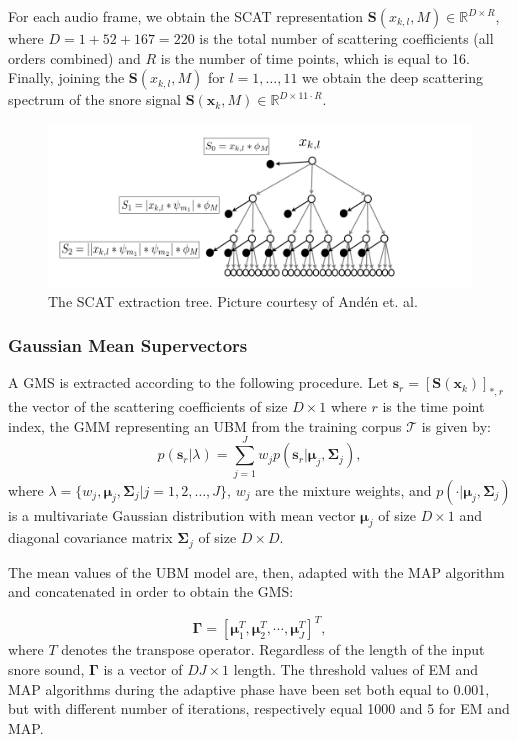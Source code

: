 For each audio frame, we obtain the SCAT representation $\mathbf{S}(x_{k,l}, M) \in \mathbb{R}^{D \times R}$, where $D=1+52+167=220$ is the total number of scattering coefficients (all orders combined) and $R$ is the number of time points, which is equal to 16. Finally, joining the $\mathbf{S}(x_{k,l}, M)$ for $l=1,\dots,11$ we obtain the deep scattering spectrum of the snore signal $\mathbf{S}(\mathbf{x}_{k}, M) \in \mathbb{R}^{D \times 11\cdot R}$.

\begin{figure}[h]
	\centering
	\includegraphics[scale=0.55]{img/scat_spectr_1}
	\caption[SCAT extraction tree]{The SCAT extraction tree. Picture courtesy of And\'{e}n et. al. }
\end{figure}


\subsubsection{Gaussian Mean Supervectors}
A GMS is extracted according to the following procedure. 
Let $\mathbf{s}_r = [\mathbf{S}(\mathbf{x}_{k})]_{*,r}$ the vector of the scattering coefficients of size $D \times 1$ where $r$ is the time point index, the GMM representing an UBM from the training corpus $\mathcal{T}$  is given by:
\begin{equation}\label{eq:ubm}
p(\mathbf{s}_r|\lambda) = \sum_{j=1}^{J}w_j p(\mathbf{s}_r|\boldsymbol{\mu}_j,\boldsymbol{\Sigma}_j),
\end{equation}
where $\lambda=\{w_j,\boldsymbol{\mu}_j,\boldsymbol{\Sigma}_j | j=1,2,\ldots,J\}$, $w_j$ are the mixture weights, and $p(\cdot|\boldsymbol{\mu}_j,\boldsymbol{\Sigma}_j)$ is a multivariate Gaussian distribution with mean vector $\boldsymbol{\mu}_j$ of size $D\times 1$ and diagonal covariance matrix $\boldsymbol{\Sigma}_j$ of size $D \times D$.

The mean values of the UBM model are, then, adapted with the MAP algorithm and concatenated in order to obtain the GMS:

\begin{equation}
\mathbf{\Gamma} = [\boldsymbol{\mu}_1^T,\boldsymbol{\mu}_2^T,\cdots,\boldsymbol{\mu}_J^T]^T,
\end{equation}
where $T$ denotes the transpose operator. Regardless of the length of the input snore sound, $\mathbf{\Gamma}$ is a vector of $DJ\times 1$ length. The threshold values of EM and MAP algorithms during the adaptive phase have been set both equal to 0.001, but with different number of iterations, respectively equal 1000 and 5 for EM and MAP.

